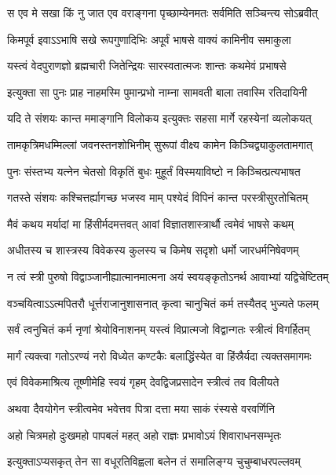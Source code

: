 \twolineshloka
{स एव मे सखा किं नु जात एव वराङ्गना}
{पृच्छाम्येनमतः सर्वमिति सञ्चिन्त्य सोऽब्रवीत्} %

\twolineshloka
{किमपूर्व इवाऽऽभाषि सखे रूपगुणादिभिः}
{अपूर्वं भाषसे वाक्यं कामिनीव समाकुला} %

\twolineshloka
{यस्त्वं वेदपुराणज्ञो ब्रह्मचारी जितेन्द्रियः}
{सारस्वतात्मजः शान्तः कथमेवं प्रभाषसे} %

\twolineshloka
{इत्युक्ता सा पुनः प्राह नाहमस्मि पुमान्प्रभो}
{नाम्ना सामवती बाला तवास्मि रतिदायिनी} %

\twolineshloka
{यदि ते संशयः कान्त ममाङ्गानि विलोकय}
{इत्युक्तः सहसा मार्गे रहस्येनां व्यलोकयत्} %

\twolineshloka
{तामकृत्रिमधम्मिल्लां जवनस्तनशोभिनीम्}
{सुरूपां वीक्ष्य कामेन किञ्चिद्व्याकुलतामगात्} %

\twolineshloka
{पुनः संस्तभ्य यत्नेन चेतसो विकृतिं बुधः}
{मुहूर्तं विस्मयाविष्टो न किञ्चित्प्रत्यभाषत} %

\twolineshloka
{गतस्ते संशयः कश्चित्तर्ह्यागच्छ भजस्व माम्}
{पश्येदं विपिनं कान्त परस्त्रीसुरतोचितम्} %

\twolineshloka
{मैवं कथय मर्यादां मा हिंसीर्मदमत्तवत्}
{आवां विज्ञातशास्त्रार्थौ त्वमेवं भाषसे कथम्} %

\twolineshloka
{अधीतस्य च शास्त्रस्य विवेकस्य कुलस्य च}
{किमेष सदृशो धर्मो जारधर्मनिषेवणम्} %

\twolineshloka
{न त्वं स्त्री पुरुषो विद्वाञ्जानीह्यात्मानमात्मना}
{अयं स्वयङ्कृतोऽनर्थ आवाभ्यां यद्विचेष्टितम्} %

\twolineshloka
{वञ्चयित्वाऽऽत्मपितरौ धूर्त्तराजानुशासनात्}
{कृत्वा चानुचितं कर्म तस्यैतद् भुज्यते फलम्} %

\twolineshloka
{सर्वं त्वनुचितं कर्म नृणां श्रेयोविनाशनम्}
{यस्त्वं विप्रात्मजो विद्वान्गतः स्त्रीत्वं विगर्हितम्} %

\twolineshloka
{मार्गं त्यक्त्वा गतोऽरण्यं नरो विध्येत कण्टकैः}
{बलाद्धिंस्येत वा हिंस्रैर्यदा त्यक्तसमागमः} %

\twolineshloka
{एवं विवेकमाश्रित्य तूष्णीमेहि स्वयं गृहम्}
{देवद्विजप्रसादेन स्त्रीत्वं तव विलीयते} %

\twolineshloka
{अथवा दैवयोगेन स्त्रीत्वमेव भवेत्तव}
{पित्रा दत्ता मया साकं रंस्यसे वरवर्णिनि} %

\twolineshloka
{अहो चित्रमहो दुःखमहो पापबलं महत्}
{अहो राज्ञः प्रभावोऽयं शिवाराधनसम्भृतः} %

\twolineshloka
{इत्युक्ताऽप्यसकृत् तेन सा वधूरतिविह्वला}
{बलेन तं समालिङ्ग्य चुचुम्बाधरपल्लवम्} %

